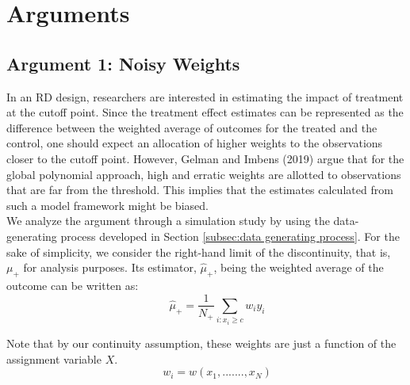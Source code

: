 \documentclass[fleqn]{article}
\begin{document}
    \section{Arguments}
    \label{sec:arguments}

    \subsection{Argument 1: Noisy Weights}
    \label{subsec: arg1}

    In an RD design, researchers are interested in estimating the impact of treatment at the cutoff point. Since the treatment effect estimates can be represented as the difference between the weighted average of outcomes for the treated and the control, one should expect an allocation of higher weights to the observations closer to the cutoff point. However, Gelman and Imbens (2019)\cite{gelman2019high} argue that for the global polynomial approach, high and erratic weights are allotted to observations that are far from the threshold. This implies that the estimates calculated from such a model framework might be biased. \\

    We analyze the argument through a simulation study by using the data-generating process developed in Section \ref{subsec:data generating process}. For the sake of simplicity, we consider the right-hand limit of the discontinuity, that is, $\mu_{+}$ for analysis purposes. Its estimator, $\hat{\mu}_{+}$, being the weighted average of the outcome can be written as:\\
    \begin{equation*}
        \qquad \hat{\mu}_{+} = \frac{1}{N_+}\sum_{i:x_{i}\geq c} w_{i}y_{i}
    \end{equation*}

    Note that by our continuity assumption, these weights are just a function of the assignment variable $X$.\\
    \begin{equation*}
        \qquad w_{i} = w(x_{1},.......,x_{N})
    \end{equation*}
\end{document}
